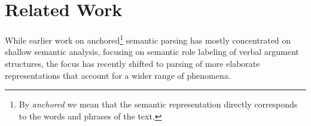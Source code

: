 \documentclass[11pt,a4paper]{article}
\newcommand{\parser}[1]{TUPA\textsubscript{#1}}
\begin{document}
\begin{table}[ht]
\caption{\label{table:constructions_results}
Results of evaluating \parser{BiLSTM} on UCCA edges corresponding to specific linguistic constructions.
Top: number of edges corresponding to each construction in the UCCA development corpus.
Bottom: F-score of \parser{BiLSTM} (in percentages) calculated just on these edges.}
\end{table}







\section{Related Work}\label{sec:related_work}

While earlier work on anchored\footnote{By {\it anchored} we mean that the semantic representation
directly corresponds to the words and phrases of the text.}
semantic parsing has mostly concentrated on shallow semantic analysis,
focusing on semantic role labeling of verbal argument structures,
the focus has recently shifted to parsing of more elaborate representations that account
for a wider range of phenomena.
\end{document}
